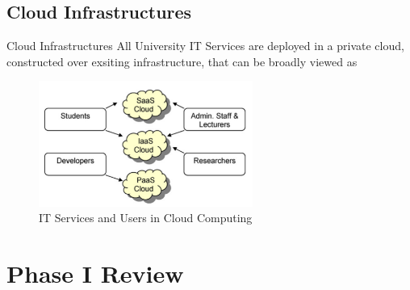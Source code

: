 \documentclass[10pt,xcolor=dvipsnames]{beamer}
\begin{document}
\subsection{Cloud Infrastructures}
\begin{frame}{Cloud Infrastructures}
All University IT Services are deployed in a private cloud, constructed over exsiting infrastructure, that can be broadly viewed as 
	
\begin{figure}[H]
\begin{center}
\includegraphics[width=7cm]{./it2.png}
\caption{ IT Services and Users in Cloud Computing\label{fig:IT Services and Users in Cloud Computing }}
\end{center}
\end{figure}	
	
	
\end{frame}


\section{Phase I Review}
 
\end{document}

